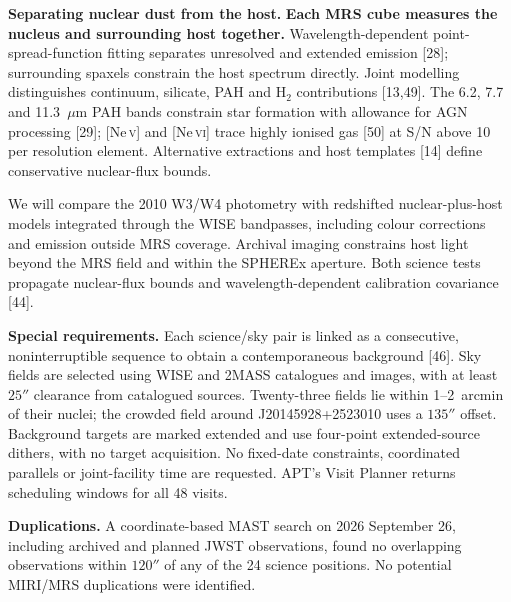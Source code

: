 \documentclass[12pt]{article}
\begin{document}
\noindent\textbf{Separating nuclear dust from the host.}
\textbf{Each MRS cube measures the nucleus and surrounding host together.} Wavelength-dependent point-spread-function fitting separates unresolved and extended emission [28]; surrounding spaxels constrain the host spectrum directly. Joint modelling distinguishes continuum, silicate, PAH and H$_2$ contributions [13,49]. The 6.2, 7.7 and 11.3~$\mu$m PAH bands constrain star formation with allowance for AGN processing [29]; [Ne\,\textsc{v}] and [Ne\,\textsc{vi}] trace highly ionised gas [50] at S/N above 10 per resolution element. Alternative extractions and host templates [14] define conservative nuclear-flux bounds.

We will compare the 2010 W3/W4 photometry with redshifted nuclear-plus-host models integrated through the WISE bandpasses, including colour corrections and emission outside MRS coverage. Archival imaging constrains host light beyond the MRS field and within the SPHEREx aperture. Both science tests propagate nuclear-flux bounds and wavelength-dependent calibration covariance [44].

\clearpage
\supplementalinformation
\noindent\textbf{Special requirements.} Each science/sky pair is linked as a consecutive, noninterruptible sequence to obtain a contemporaneous background [46]. Sky fields are selected using WISE and 2MASS catalogues and images, with at least $25''$ clearance from catalogued sources. Twenty-three fields lie within 1--2~arcmin of their nuclei; the crowded field around J20145928+2523010 uses a $135''$ offset. Background targets are marked extended and use four-point extended-source dithers, with no target acquisition. No fixed-date constraints, coordinated parallels or joint-facility time are requested. APT's Visit Planner returns scheduling windows for all 48 visits.

\noindent\textbf{Duplications.} A coordinate-based MAST search on 2026 September 26, including archived and planned JWST observations, found no overlapping observations within $120''$ of any of the 24 science positions. No potential MIRI/MRS duplications were identified.
\end{document}
